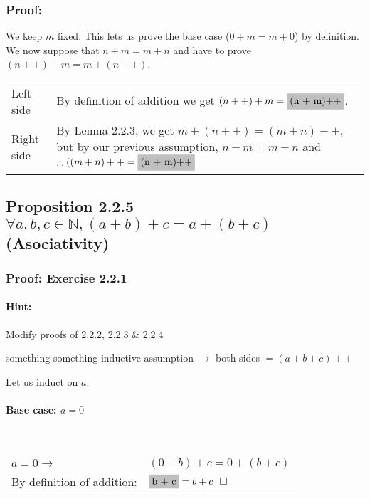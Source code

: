\documentclass[letterpaper]{article}
\begin{document}
\subsubsection*{Proof:}
We keep $m$ fixed. This lets us prove the base case ($0+m = m+0$) by definition. We now suppose that $n+m = m+n$ and have to prove $(n++) + m = m + (n++)$. 
\hspace{0.5cm}

\begin{tabular}{l p{13cm}}
	Left side  & 
	By definition of addition we get $(n++) + m = \colorbox{lightgray}{(n + m)++}$. 
	\\
	Right side & 
	By Lemna 2.2.3, we get $m + (n++) = (m + n)++$, but by our previous assumption, $n + m = m + n$ and $\therefore ((m + n)++ = \colorbox{lightgray}{(n + m)++} $
\end{tabular}

\subsection*{Proposition 2.2.5 $\forall a,b,c \in \mathbb{N}, (a + b) + c = a + (b + c)$ (Asociativity)}
\subsubsection*{Proof: Exercise 2.2.1}
\paragraph{Hint:}
Modify proofs of 2.2.2, 2.2.3 \& 2.2.4

something something inductive assumption $\to$ both sides $= (a + b + c) ++$

Let us induct on $a$.
\vspace{\parskip}

\paragraph{Base case: $a = 0$}~

\begin{center}
	\begin{tabular}{l l}
		$a = 0 \to$                & $(0 + b) + c = 0 + (b + c)$                     \\
		By definition of addition: & $\colorbox{lightgray}{b + c} = b + c ~~\square$ \\
	\end{tabular}
\end{center}
\end{document}
